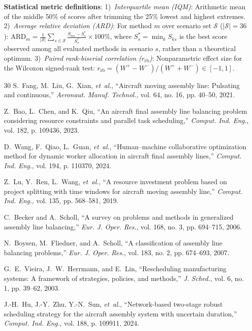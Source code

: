 \documentclass[journal,10pt]{IEEEtran}
\begin{document}
\textbf{Statistical metric definitions}:
1)~\textit{Interquartile mean (IQM)}: Arithmetic mean of the middle 50\% of scores after trimming the 25\% lowest and highest extremes.
2)~\textit{Average relative deviation (ARD)}: For method $m$ over scenario set $\mathcal S$ ($|\mathcal S|=36$): $\mathrm{ARD}_m = \frac{1}{|\mathcal S|}\sum_{s\in\mathcal S} \frac{S_{ms}-S_s^*}{S_s^*}\times100\%$, where $S_s^*=\min_k S_{ks}$ is the best score observed among all evaluated methods in scenario $s$, rather than a theoretical optimum.
3)~\textit{Paired rank-biserial correlation ($r_{\mathrm{rb}}$)}: Nonparametric effect size for the Wilcoxon signed-rank test: $r_{\mathrm{rb}}=(W^+-W^-)/(W^++W^-)\in[-1,1]$.

\begin{thebibliography}{30}
S.~Fang, M.~Liu, G.~Xian, \textit{et~al.}, ``Aircraft moving assembly line: Pulsating and continuous,'' \textit{Aeronaut. Manuf. Technol.}, vol. 64, no. 16, pp. 40--50, 2021.

Z.~Bao, L.~Chen, and K.~Qiu, ``An aircraft final assembly line balancing problem considering resource constraints and parallel task scheduling,'' \textit{Comput. Ind. Eng.}, vol. 182, p. 109436, 2023.

D.~Wang, F.~Qiao, L.~Guan, \textit{et~al.}, ``Human--machine collaborative optimization method for dynamic worker allocation in aircraft final assembly lines,'' \textit{Comput. Ind. Eng.}, vol. 194, p. 110370, 2024.

Z.~Lu, Y.~Ren, L.~Wang, \textit{et~al.}, ``A resource investment problem based on project splitting with time windows for aircraft moving assembly line,'' \textit{Comput. Ind. Eng.}, vol. 135, pp. 568--581, 2019.

C.~Becker and A.~Scholl, ``A survey on problems and methods in generalized assembly line balancing,'' \textit{Eur. J. Oper. Res.}, vol. 168, no. 3, pp. 694--715, 2006.

N.~Boysen, M.~Fliedner, and A.~Scholl, ``A classification of assembly line balancing problems,'' \textit{Eur. J. Oper. Res.}, vol. 183, no. 2, pp. 674--693, 2007.

G.~E.~Vieira, J.~W.~Herrmann, and E.~Lin, ``Rescheduling manufacturing systems: A framework of strategies, policies, and methods,'' \textit{J. Sched.}, vol. 6, no. 1, pp. 39--62, 2003.

J.-H.~Hu, J.-Y.~Zhu, Y.-N.~Sun, \textit{et~al.}, ``Network-based two-stage robust scheduling strategy for the aircraft assembly system with uncertain duration,'' \textit{Comput. Ind. Eng.}, vol. 188, p. 109911, 2024.


\end{thebibliography}
\end{document}

